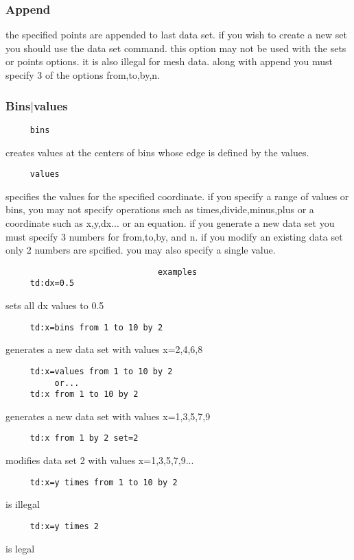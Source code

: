 \subsubsection{Append}
the  specified  points  are  appended to last data set.  if you wish to
create a new set you should use the data set command.  this option  may
not  be  used  with the sets or points options.  it is also illegal for
mesh data.  along with  append  you  must  specify  3  of  the  options
from,to,by,n.  
\subsubsection{Bins$|$values}
\begin{verbatim}
     bins
\end{verbatim}
creates  values  at  the  centers  of bins whose edge is defined by the
values.  
\begin{verbatim}
     values
\end{verbatim}
specifies  the  values  for the specified coordinate.  if you specify a
range of values or  bins,  you  may  not  specify  operations  such  as
times,divide,minus,plus  or  a  coordinate  such  as  x,y,dx...   or an
equation.  if you generate a new data set you must  specify  3  numbers
for  from,to,by,  and  n.   if  you  modify an existing data set only 2
numbers are spcified.  you may also specify a single value.  
\begin{verbatim}
                               examples
     td:dx=0.5 
\end{verbatim}
sets all dx values to 0.5 
\begin{verbatim}
     td:x=bins from 1 to 10 by 2 
\end{verbatim}
generates a new data set with values x=2,4,6,8 
\begin{verbatim}
     td:x=values from 1 to 10 by 2 
          or...  
     td:x from 1 to 10 by 2 
\end{verbatim}
generates a new data set with values x=1,3,5,7,9 
\begin{verbatim}
     td:x from 1 by 2 set=2 
\end{verbatim}
modifies data set 2 with values x=1,3,5,7,9...  
\begin{verbatim}
     td:x=y times from 1 to 10 by 2 
\end{verbatim}
is illegal 
\begin{verbatim}
     td:x=y times 2 
\end{verbatim}
is legal 
